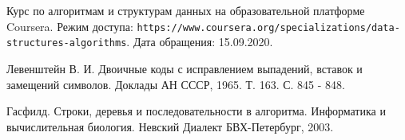 \begin{thebibliography}{9}

Курс по алгоритмам и структурам данных на образовательной платформе Coursera. 
Режим доступа: \texttt{https://www.coursera.org/specializations/data-structures-algorithms}. Дата обращения: 15.09.2020.

Левенштейн В. И. Двоичные коды с исправлением выпадений, вставок и замещений символов. Доклады АН СССР, 1965. Т. 163. С. 845 - 848.

Гасфилд. Строки, деревья и последовательности в алгоритма. Информатика и вычислительная биология. Невский Диалект БВХ-Петербург, 2003.

\end{thebibliography}
